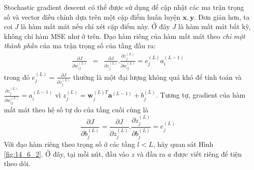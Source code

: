 Stochastic gradient descent có thể được sử dụng để cập nhật các ma trận trọng số và vector điều chỉnh dựa trên một cặp điểm huấn luyện $\mathbf{x, y}$. Đơn giản hơn, ta coi $J$ là hàm mất mát nếu chỉ xét cặp điểm này. Ở đây $J$ là hàm mất mát bất kỳ, không chỉ hàm MSE như ở trên. 
 Đạo hàm riêng của hàm mất mát theo \textit{chỉ một thành phần} của ma trận trọng số
của tầng đầu ra:
\begin{eqnarray} 
\frac{\partial J}{\partial w_{ij}^{(L)}} &=& \frac{\partial J}{\partial
z_j^{(L)}}. \frac{\partial z_j^{(L)}}{\partial w_{ij}^{(L)}} = e_j^{(L)} a_i^{(L-1)} 
\end{eqnarray} 
trong đó $\displaystyle e_j^{(L)} = \frac{\partial J}{\partial z_j^{(L)}} $
thường là một đại
lượng {không quá khó để tính toán} và $\displaystyle\frac{\partial
z_j^{(L)}}{\partial w_{ij}^{(L)}}  = a_i^{(L-1)}$ vì $z_j^{(L)} = \mathbf{w}_j^{(L)T}\mathbf{a}^{(L-1)} + b_j^{(L)}$.
Tương tự, gradient của hàm mất mát theo hệ số tự do của tầng cuối cùng là
\begin{equation} 
\frac{\partial J}{\partial b_{j}^{(L)}} = \frac{\partial J}{\partial z_j^{(L)}}. \frac{\partial z_j^{(L)}}{\partial b_{j}^{(L)}} = e_j^{(L)} 
\end{equation} 
Với đạo hàm riêng theo trọng số ở các tầng $l < L$, hãy quan sát Hình
\ref{fig:14_6_2}. Ở đây, tại mỗi nút, đầu vào $z$ và đầu ra $a$ được viết
riêng để tiện theo dõi.

